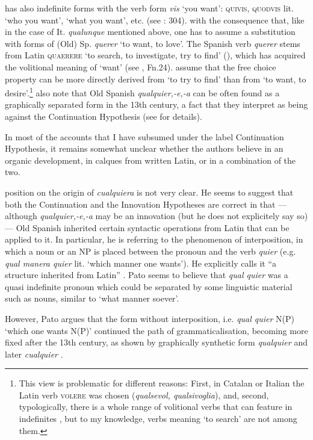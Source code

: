 {{has also indefinite forms with the verb form} {\textit{vis}} {‘you want’:} {\textsc{quivis}}, {\textsc{quodvis}} {lit. ‘who you want’, ‘what you want’, etc. (see \citealt{Pato2012}: 304).}} with the consequence that, like in the case of It. \textit{qualunque} mentioned above, one has to assume a substitution with forms of (Old) Sp. \textit{querer} ‘to want, to love’. The Spanish verb \textit{querer} stems from Latin \textsc{quaerere} ‘to search, to investigate, try to find’ (\citealt{cp2009}), which has acquired the volitional meaning of ‘want’ (see \citealt[1152]{cp2009}, Fn.24). \citet[1152]{cp2009} assume that the free choice property can be more directly derived from ‘to try to find’ than from ‘to want, to desire’.\footnote{{This view is problematic for different reasons: First, in Catalan or Italian the Latin verb} {\textsc{volere}} {was chosen (}{\textit{qualsevol, qualsivoglia}}{), and, second, typologically, there is a whole range of volitional verbs that can feature in indefinites \citep{Haspelmath1997}, but to my knowledge, verbs meaning ‘to search’ are not among them.}} \citeauthor{cp2009} also note that Old Spanish \textit{qualquier,-e,-a} can be often found as a graphically separated form in the 13th century, a fact that they interpret as being against the Continuation Hypothesis (see  for details).

\largerpage
  In most of the accounts that I have subsumed under the label Continuation Hypothesis, it remains somewhat unclear whether the authors believe in an organic development, in calques from written Latin, or in a combination of the two.

   position on the origin of \textit{cualquiera} is not very clear. He seems to suggest that both the Continuation and the Innovation Hypotheses are correct in that — although \textit{qualquier,-e,-a} may be an innovation (but he does not explicitely say so) — Old Spanish inherited certain syntactic operations from Latin that can be applied to it. In particular, he is referring to the phenomenon of interposition, in which a noun or an NP is placed between the pronoun and the verb \textit{quier} (e.g. \textit{qual manera quier} lit. ‘which manner one wants’). He explicitly calls it “a structure inherited from Latin” \citep[273]{Pato2012}. Pato seems to believe that \textit{qual quier} was a quasi indefinite pronoun which could be separated by some linguistic material such as nouns, similar to ‘what manner soever’.

  However, Pato argues that the form without interposition, i.e. \textit{qual quier} N(P) ‘which one wants N(P)’ continued the path of grammaticalisation, becoming more fixed after the 13th century, as shown by graphically synthetic form \textit{qualquier} and later \textit{cualquier} \citep[297]{Pato2012}.

